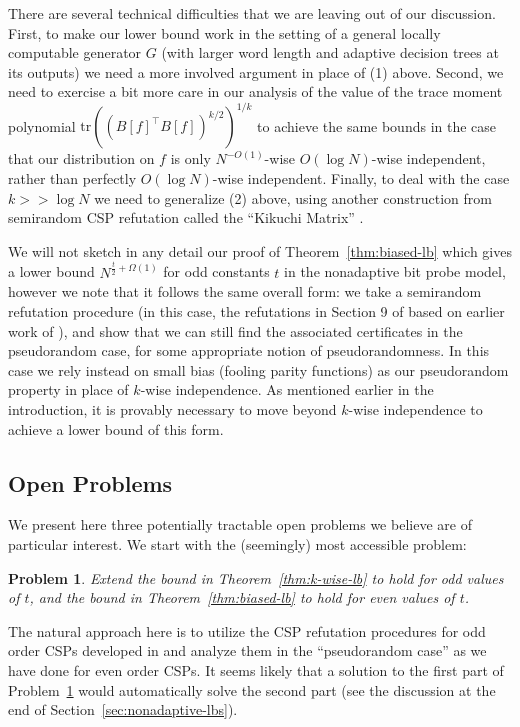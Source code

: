 \documentclass[11pt]{article}
\newtheorem{problem}{Problem}
\begin{document}
There are several technical difficulties that we are leaving out of our discussion. First, to make our lower bound work in the setting of a general locally computable generator $G$ (with larger word length and adaptive decision trees at its outputs) we need a more involved argument in place of (1) above. Second, we need to exercise a bit more care in our analysis of the value of the trace moment polynomial $\mathrm{tr}((B[f]^\top B[f])^{k/2})^{1/k}$ to achieve the same bounds in the case that our distribution on $f$ is only $N^{-O(1)}$-wise $O(\log N)$-wise independent, rather than perfectly $O(\log N)$-wise independent. Finally, to deal with the case $k >> \log N$ we need to generalize (2) above, using another construction from semirandom CSP refutation called the ``Kikuchi Matrix'' \cite{wein2019kikuchi,smoothed}. 

We will not sketch in any detail our proof of Theorem~\ref{thm:biased-lb} which gives a lower bound $N^{\frac{t}{2} + \Omega(1)}$ for odd constants $t$ in the nonadaptive bit probe model, however we note that it follows the same overall form: we take a semirandom refutation procedure (in this case, the refutations in Section 9 of \cite{smoothed} based on earlier work of \cite{FKO}), and show that we can still find the associated certificates in the pseudorandom case, for some appropriate notion of pseudorandomness. In this case we rely instead on small bias (fooling parity functions) as our pseudorandom property in place of $k$-wise independence. As mentioned earlier in the introduction, it is provably necessary to move beyond $k$-wise independence to achieve a lower bound of this form.

\subsection{Open Problems}

We present here three potentially tractable open problems we believe are of particular interest.
We start with the (seemingly) most accessible problem:
\begin{problem}\label{prob:odd-vs-even}
Extend the bound in Theorem~\ref{thm:k-wise-lb} to hold for odd values of $t$, and the bound in Theorem~\ref{thm:biased-lb} to hold for even values of $t$.
\end{problem}
 The natural approach here is to utilize the CSP refutation procedures for odd order CSPs developed in \cite{semirandom,smoothed} and analyze them in the ``pseudorandom case'' as we have done for even order CSPs. It seems likely that a solution to the first part of Problem~\ref{prob:odd-vs-even} would automatically solve the second part (see the discussion at the end of Section~\ref{sec:nonadaptive-lbs}).
\end{document}
